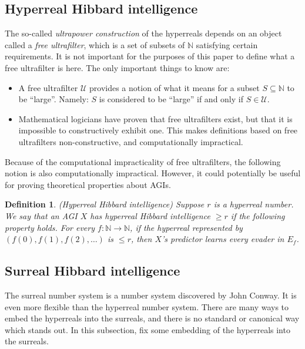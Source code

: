 \documentclass{article}
\newtheorem{definition}[theorem]{Definition}
\begin{document}
\subsection{Hyperreal Hibbard intelligence}

The so-called \emph{ultrapower construction} of the hyperreals depends on an object
called a \emph{free ultrafilter}, which is a set of subsets of $\mathbb N$ satisfying
certain requirements. It is not important for the purposes of this paper to define what
a free ultrafilter is here. The only important things to know are:
\begin{itemize}
    \item
    A free ultrafilter $\mathscr U$ provides a notion of what it means for a subset
    $S\subseteq\mathbb N$ to be ``large''. Namely: $S$ is considered to be ``large''
    if and only if $S\in \mathscr U$.
    \item
    Mathematical logicians have proven that free ultrafilters exist, but that it is
    impossible to constructively exhibit one. This makes definitions based on free
    ultrafilters non-constructive, and computationally impractical.
\end{itemize}

Because of the computational impracticality of free ultrafilters, the following notion
is also computationally impractical. However, it could potentially be useful for
proving theoretical properties about AGIs.

\begin{definition}
\label{hyperrealhibbardintelligencedefn}
    (Hyperreal Hibbard intelligence)
    Suppose $r$ is a hyperreal number. We say that an AGI $X$ has \emph{hyperreal
    Hibbard intelligence $\geq r$} if the following property holds.
    For every $f:\mathbb N\to\mathbb N$, if the hyperreal represented by
    $(f(0),f(1),f(2),\ldots)$ is $\leq r$, then $X$'s predictor learns every
    evader in $E_f$.
\end{definition}

\subsection{Surreal Hibbard intelligence}

The surreal number system is a number system discovered by John Conway. It is even
more flexible than the hyperreal number system.
There are many ways to embed the hyperreals into the surreals, and there is no
standard or canonical way which stands out. In this subsection, fix some embedding
of the hyperreals into the surreals.
\end{document}
